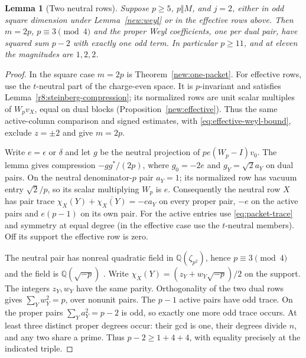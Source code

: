 \documentclass[11pt]{amsart}
\numberwithin{equation}{section}
\newtheorem{lemma}[theorem]{Lemma}
\theoremstyle{definition}
\theoremstyle{plain}
\newcommand{\QQ}{\mathbb Q}
\begin{document}
\begin{lemma}[Two neutral rows]\label{odd:two-neutral}
Suppose $p\ge5$, $p\Vert M$, and $j=2$, either in odd square
dimension under Lemma~\ref{new:weyl} or in the effective rows above.
Then $m=2p$, $p\equiv3\pmod4$ and the proper Weyl coefficients,
one per dual pair, have squared sum $p-2$ with exactly one odd term.
In particular $p\ge11$, and at eleven the magnitudes are $1,2,2$.
\end{lemma}
\begin{proof}
In the square case $m=2p$ is Theorem~\ref{new:one-packet}.
For effective rows, use the $t$-neutral part of the charge-even space.
It is $p$-invariant and satisfies Lemma~\ref{r8:steinberg-compression};
its normalized rows are unit scalar multiples of $W_pv_X$, equal
on dual blocks (Proposition~\ref{new:effective}). Thus the same
active-column comparison and signed estimates, with
\eqref{eq:effective-weyl-bound}, exclude $z=\pm2$ and give $m=2p$.

Write $e=\epsilon$ or $\delta$ and let $g$ be the neutral projection
of $pe(W_p-I)v_0$. The lemma gives compression $-gg^*/(2p)$,
where $g_0=-2e$ and $g_Y=\sqrt2a_Y$ on dual pairs. On the neutral
denominator-$p$ pair $a_Y=1$; its normalized row has vacuum entry
$\sqrt2/p$, so its scalar multiplying $W_p$ is $e$.
Consequently the neutral row $X$ has pair trace
$\chi_X(Y)+\overline{\chi_X(Y)}=-e a_Y$ on every proper pair,
$-e$ on the active pairs and $e(p-1)$ on its own pair.
For the active entries use \eqref{eq:packet-trace} and symmetry
at equal degree (in the effective case use the $t$-neutral members).
Off its support the effective row is zero.

The neutral pair has nonreal quadratic field in $\QQ(\zeta_{p^2})$,
hence $p\equiv3\pmod4$ and the field is $\QQ(\sqrt{-p})$
\cite[Ch.~6]{Washington}. Write
$\chi_X(Y)=(z_Y+w_Y\sqrt{-p})/2$ on the support.
The integers $z_Y,w_Y$ have the same parity. Orthogonality of the
two dual rows gives $\sum_Y w_Y^2=p$, over nonunit pairs.
The $p-1$ active pairs have odd trace. On the proper pairs
$\sum_Y a_Y^2=p-2$ is odd, so exactly one more odd trace occurs.
At least three distinct proper degrees occur: their gcd is one,
their degrees divide $n$, and any two share a prime. Thus
$p-2\ge1+4+4$, with equality precisely at the indicated triple.
\end{proof}
\end{document}
